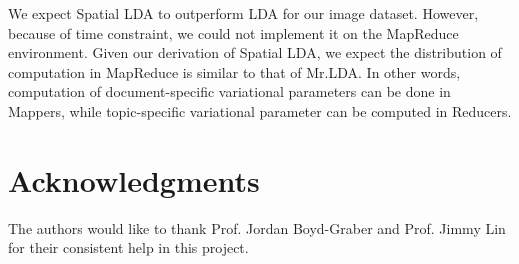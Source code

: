\documentclass{acm_proc_article-sp}
\begin{document}
We expect Spatial LDA to outperform LDA for our image dataset. However, because of time constraint, we could not implement it on the MapReduce environment. Given our derivation of Spatial LDA, we expect the distribution of computation in MapReduce is similar to that of Mr.LDA. In other words, computation of document-specific variational parameters can be done in Mappers, while topic-specific variational parameter can be computed in Reducers.

\section*{Acknowledgments}
The authors would like to thank Prof. Jordan Boyd-Graber and Prof. Jimmy Lin for their consistent help in this project.


\end{document}
